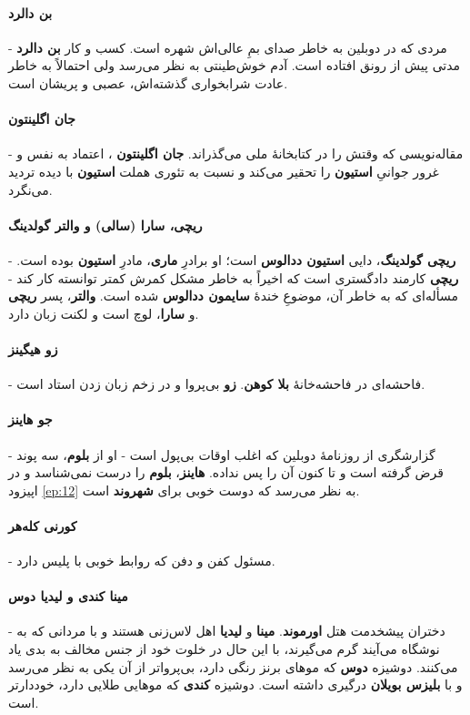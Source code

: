 \documentclass[12pt]{book}
\newcommand{\noun}[1]{{\textbf{#1}}}
\begin{document}
    \paragraph{\noun{بن دالرد}\protect{}} -
    مردی که در دوبلین به خاطر صدای بمِ عالی‌اش شهره است. کسب و کار \noun{بن دالرد}  مدتی پیش از رونق افتاده است. آدم خوش‌طینتی به نظر می‌رسد ولی احتمالاً به خاطر عادت شرابخواری گذشته‌اش، عصبی و پریشان است.
    \paragraph{\noun{جان اگلینتون}\protect{}} -
    مقاله‌نویسی که وقتش را در کتابخانهٔ ملی می‌گذراند. \noun{جان اگلینتون} ، اعتماد به نفس و غرور جوانیِ \noun{استیون} را تحقیر می‌کند و نسبت به تئوری هملت \noun{استیون} با دیده تردید می‌نگرد.
    \paragraph{\noun{ریچی، سارا (سالی) و والتر گولدینگ}\protect{}} -
    \noun{ریچی گولدینگ}، دایی \noun{استیون ددالوس} است؛ او برادرِ \noun{ماری}، مادرِ \noun{استیون} بوده است. \noun{ریچی} کارمند دادگستری است که اخیراً به خاطر مشکل کمرش کمتر توانسته کار کند - مسأله‌ای که به خاطر آن، موضوعِ خندهٔ \noun{سایمون  ددالوس} شده است. \noun{والتر}، پسر \noun{ریچی} و \noun{سارا}، لوچ است و لکنت زبان دارد.
    \paragraph{\noun{زو هیگینز}\protect{}} -
    فاحشه‌ای در فاحشه‌خانهٔ \noun{بلا کوهن}. \noun{زو} بی‌پروا و در زخم زبان زدن استاد است.
    \paragraph{\noun{جو هاینز}\protect{}} -
    گزارشگری از روزنامهٔ دوبلین که اغلب اوقات بی‌پول است - او از \noun{بلوم}، سه پوند قرض گرفته است و تا کنون آن را پس نداده. \noun{هاینز}، \noun{بلوم} را درست نمی‌شناسد و در اپیزود \ref{ep:12} به نظر می‌رسد که دوست خوبی برای \noun{شهروند‬} است.
    \paragraph{\noun{کورنی کله‌هر}\protect{}} -
    مسئول کفن و دفن که روابط خوبی با پلیس دارد.
    \paragraph{\noun{مینا کندی و لیدیا دوس}\protect{}} -
    دختران پیشخدمت هتل \noun{اورموند}. \noun{مینا} و \noun{لیدیا} اهل لاس‌زنی هستند و با مردانی که به نوشگاه می‌آیند گرم می‌گیرند، با این حال در خلوت خود از جنس مخالف به بدی یاد می‌کنند. دوشیزه \noun{دوس} که موهای برنز رنگی دارد، بی‌پرواتر از آن یکی به نظر می‌رسد و با \noun{بلیزس بویلان‬} درگیری داشته است. دوشیزه \noun{کندی} که موهایی طلایی دارد، خوددارتر است.
\end{document}
